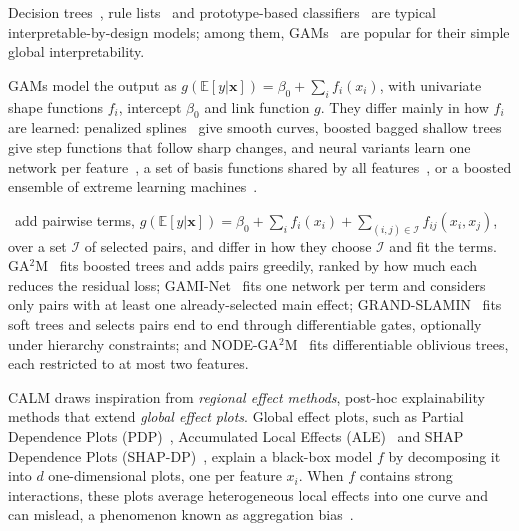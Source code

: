 Decision trees~\cite{breiman1984cart}, rule lists~\cite{letham2015stroke, angelino2018learningcertifiablyoptimalrule} and prototype-based classifiers~\cite{chen2019looks, bien2012prototype} are typical interpretable-by-design models; among them, GAMs~\cite{hastie1990generalized, wood2017generalized} are popular for their simple global interpretability.

GAMs model the output as $g(\mathbb{E}[y|\mathbf{x}]) = \beta_0 + \sum_{i} f_i(x_i)$, with univariate shape functions $f_i$, intercept $\beta_0$ and link function $g$.
They differ mainly in how $f_i$ are learned: penalized splines~\cite{wood2017generalized} give smooth curves, boosted bagged shallow trees~\cite{lou2012intelligible, nori2019interpretml} give step functions that follow sharp changes, and neural variants learn one network per feature~\cite{agarwal2021neural}, a set of basis functions shared by all features~\cite{radenovic2022neural}, or a boosted ensemble of extreme learning machines~\cite{KRAUS2024IGANN}.

\gamms~add pairwise terms, $g(\mathbb{E}[y|\mathbf{x}]) = \beta_0 + \sum_{i} f_i(x_i) + \sum_{(i,j)\in\mathcal{I}} f_{ij}(x_i, x_j)$, over a set $\mathcal{I}$ of selected pairs, and differ in how they choose $\mathcal{I}$ and fit the terms.
GA$^2$M~\cite{lou2013accurate} fits boosted trees and adds pairs greedily, ranked by how much each reduces the residual loss;
GAMI-Net~\cite{yang2020gami} fits one network per term and considers only pairs with at least one already-selected main effect;
GRAND-SLAMIN~\cite{ibrahim2023grandslamin} fits soft trees and selects pairs end to end through differentiable gates, optionally under hierarchy constraints;
and NODE-GA$^2$M~\cite{chang2022node} fits differentiable oblivious trees, each restricted to at most two features.

CALM draws inspiration from \emph{regional effect methods}, post-hoc explainability methods that extend \emph{global effect plots}.
Global effect plots, such as Partial Dependence Plots (PDP)~\cite{friedman2001greedy}, Accumulated Local Effects (ALE)~\cite{apley2020visualizing} and SHAP Dependence Plots (SHAP-DP)~\cite{lundberg2020local}, explain a black-box model $f$ by decomposing it into $d$ one-dimensional plots, one per feature $x_i$.
When $f$ contains strong interactions, these plots average heterogeneous local effects into one curve and can mislead, a phenomenon known as aggregation bias~\cite{mehrabi2021survey, herbinger2022REPID, baniecki2024robustness, gkolemis2023rhale}.


